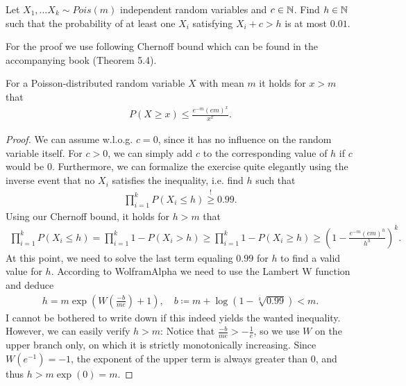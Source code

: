 \begin{aufgabe}
Let $X_1, \dots X_k \sim Pois(m)$ independent random variables and $c \in \mathbb{N}$.
Find $h \in \mathbb{N}$ such that the probability of at least one $X_i$ satisfying $X_i + c > h$ is at most $0.01$.

For the proof we use following Chernoff bound which can be found in the accompanying book (Theorem 5.4).
\begin{fact}
    For a Poisson-distributed random variable $X$ with mean $m$ it holds for $x > m$ that
    \begin{align*}
        P(X \geq x) \leq \frac{e^{-m}(em)^x}{x^x}.
    \end{align*}
\end{fact}
\begin{proof}
    We can assume w.l.o.g. $c=0$, since it has no influence on the random variable itself.
    For $c > 0$, we can simply add $c$ to the corresponding value of $h$ if $c$ would be $0$.
    Furthermore, we can formalize the exercise quite elegantly using the inverse event that no $X_i$ satisfies the inequality, i.e. find $h$ such that
    \begin{align*}
        \prod_{i=1}^{k}P(X_i \leq h) \overset{!}{\geq} 0.99.
    \end{align*}
    Using our Chernoff bound, it holds for $h > m$ that
    \begin{align*}
        \prod_{i=1}^{k}P(X_i \leq h) = \prod_{i=1}^{k}1 - P(X_i > h) \geq \prod_{i=1}^{k}1 - P(X_i \geq h) \geq\left(1- \frac{e^{-m}(em)^{h}}{h^{h}}\right)^k.
    \end{align*}
    At this point, we need to solve the last term equaling $0.99$ for $h$ to find a valid value for $h$.
    According to WolframAlpha we need to use the Lambert W function and deduce
    \begin{align*}
        h = m\exp\left(W\left(\frac{-b}{me}\right)+1  \right), \quad b \coloneqq m + \log(1-\sqrt[k]{0.99}) < m.
    \end{align*}
    I cannot be bothered to write down if this indeed yields the wanted inequality.
    However, we can easily verify $h > m$:
    Notice that $\frac{-b}{me} > - \frac{1}{e}$, so we use $W$ on the upper branch only, on which it is strictly monotonically increasing.
    Since $W(e^{-1})=-1$, the exponent of the upper term is always greater than $0$, and thus $h > m \exp(0) = m$.
\end{proof}
\end{aufgabe}
